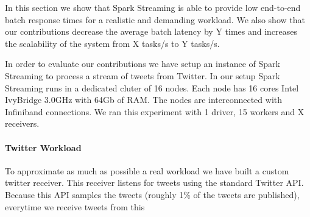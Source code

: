 \noindent

In this section we show that Spark Streaming is able to provide low end-to-end batch response times for a realistic and demanding workload. We also show that our contributions decrease the average batch latency by Y times and increases the scalability of the system from X tasks/s to Y tasks/s.

In order to evaluate our contributions we have setup an instance of Spark Streaming to process a stream of tweets from Twitter. In our setup Spark Streaming runs in a dedicated cluter of 16 nodes. Each node has 16 cores  Intel IvyBridge 3.0GHz with 64Gb of RAM. The nodes are interconnected with Infiniband connections. We ran this experiment with 1 driver, 15 workers and X receivers.

\paragraph {\bf Twitter Workload} To approximate as much as possible a real workload we have built a custom twitter receiver. This receiver listens for tweets using the standard Twitter API. Because this API samples the tweets (roughly 1\% of the tweets are published), everytime we receive tweets from this 
